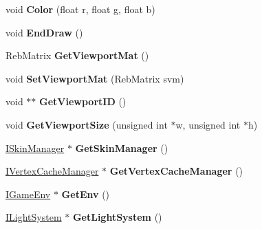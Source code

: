 \begin{DoxyCompactItemize}
\item 
void {\bfseries Color} (float r, float g, float b)\hypertarget{class_reb_g_l_aa84d7b69e407faa7488887a9329bb9c7}{}\label{class_reb_g_l_aa84d7b69e407faa7488887a9329bb9c7}

\item 
void {\bfseries End\+Draw} ()\hypertarget{class_reb_g_l_aa1f59fc89eaad11a311c77969e38f538}{}\label{class_reb_g_l_aa1f59fc89eaad11a311c77969e38f538}

\item 
Reb\+Matrix {\bfseries Get\+Viewport\+Mat} ()\hypertarget{class_reb_g_l_a926d3465d00d67e5d1229ff3cca22ee5}{}\label{class_reb_g_l_a926d3465d00d67e5d1229ff3cca22ee5}

\item 
void {\bfseries Set\+Viewport\+Mat} (Reb\+Matrix svm)\hypertarget{class_reb_g_l_a72a4a10017e0e719ddebe2f39fcb589c}{}\label{class_reb_g_l_a72a4a10017e0e719ddebe2f39fcb589c}

\item 
void $\ast$$\ast$ {\bfseries Get\+Viewport\+ID} ()\hypertarget{class_reb_g_l_a10b62dc3d65d9167ef10f5f1423d0fd8}{}\label{class_reb_g_l_a10b62dc3d65d9167ef10f5f1423d0fd8}

\item 
void {\bfseries Get\+Viewport\+Size} (unsigned int $\ast$w, unsigned int $\ast$h)\hypertarget{class_reb_g_l_a0f05955070e51f2f47242c9bb8aa847b}{}\label{class_reb_g_l_a0f05955070e51f2f47242c9bb8aa847b}

\item 
\hyperlink{class_i_skin_manager}{I\+Skin\+Manager} $\ast$ {\bfseries Get\+Skin\+Manager} ()\hypertarget{class_reb_g_l_ade78ba9aa97586f1608d0986120c4f40}{}\label{class_reb_g_l_ade78ba9aa97586f1608d0986120c4f40}

\item 
\hyperlink{class_i_vertex_cache_manager}{I\+Vertex\+Cache\+Manager} $\ast$ {\bfseries Get\+Vertex\+Cache\+Manager} ()\hypertarget{class_reb_g_l_a7442199d1dc6762083f7af38f5c9481b}{}\label{class_reb_g_l_a7442199d1dc6762083f7af38f5c9481b}

\item 
\hyperlink{class_i_game_env}{I\+Game\+Env} $\ast$ {\bfseries Get\+Env} ()\hypertarget{class_reb_g_l_acfc702ba1f9eb20a6c97ca72eee1a1a3}{}\label{class_reb_g_l_acfc702ba1f9eb20a6c97ca72eee1a1a3}

\item 
\hyperlink{class_i_light_system}{I\+Light\+System} $\ast$ {\bfseries Get\+Light\+System} ()\hypertarget{class_reb_g_l_a57557a3c7812b927ad00b3a7ed0544b3}{}\label{class_reb_g_l_a57557a3c7812b927ad00b3a7ed0544b3}


\end{DoxyCompactItemize}
